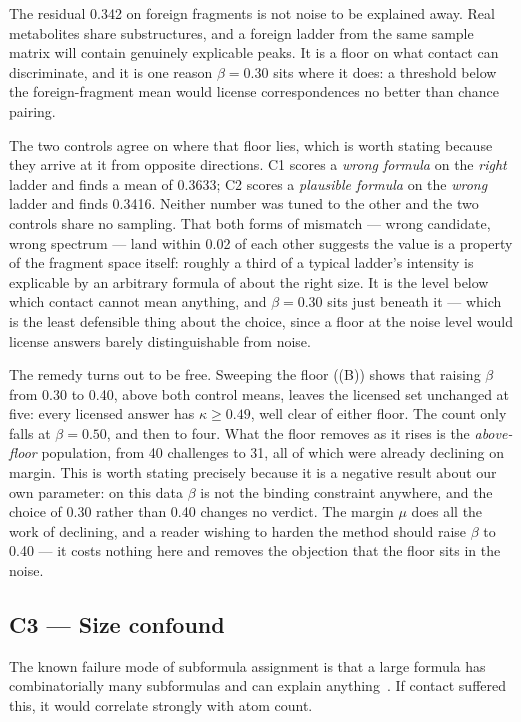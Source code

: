 \documentclass[11pt,twocolumn,a4paper]{article}
\theoremstyle{definition}
\theoremstyle{remark}
\newcommand{\con}{\kappa}
\begin{document}
The residual 0.342 on foreign fragments is not noise to be explained away. Real
metabolites share substructures, and a foreign ladder from the same sample matrix
will contain genuinely explicable peaks. It is a floor on what contact can
discriminate, and it is one reason $\beta = 0.30$ sits where it does: a threshold
below the foreign-fragment mean would license correspondences no better than
chance pairing.

The two controls agree on where that floor lies, which is worth stating because
they arrive at it from opposite directions. C1 scores a \emph{wrong formula} on
the \emph{right} ladder and finds a mean of 0.3633; C2 scores a \emph{plausible
formula} on the \emph{wrong} ladder and finds 0.3416. Neither number was tuned to
the other and the two controls share no sampling. That both forms of mismatch ---
wrong candidate, wrong spectrum --- land within 0.02 of each other suggests the
value is a property of the fragment space itself: roughly a third of a typical
ladder's intensity is explicable by an arbitrary formula of about the right size.
It is the level below which contact cannot mean anything, and $\beta = 0.30$ sits
just beneath it --- which is the least defensible thing about the choice, since a
floor at the noise level would license answers barely distinguishable from noise.

The remedy turns out to be free. Sweeping the floor ((B)) shows
that raising $\beta$ from 0.30 to 0.40, above both control means, leaves the
licensed set unchanged at five: every licensed answer has $\con \ge 0.49$, well
clear of either floor. The count only falls at $\beta = 0.50$, and then to four.
What the floor removes as it rises is the \emph{above-floor} population, from 40
challenges to 31, all of which were already declining on margin. This is worth
stating precisely because it is a negative result about our own parameter: on this
data $\beta$ is not the binding constraint anywhere, and the choice of 0.30 rather
than 0.40 changes no verdict. The margin $\mu$ does all the work of declining, and
a reader wishing to harden the method should raise $\beta$ to 0.40 --- it costs
nothing here and removes the objection that the floor sits in the noise.

\subsection{C3 --- Size confound}

The known failure mode of subformula assignment is that a large formula has
combinatorially many subformulas and can explain anything~\citep{bocker2009fragmentation}.
If contact suffered this, it would correlate strongly with atom count.
\end{document}
